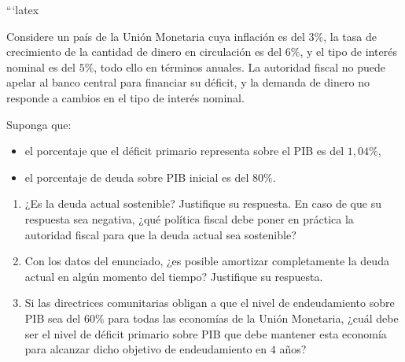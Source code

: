 ```latex
\begin{exercise}
Considere un país de la Unión Monetaria cuya inflación es del $3\%$, la tasa de crecimiento de la cantidad de dinero en circulación es del $6\%$, y el tipo de interés nominal es del $5\%$, todo ello en términos anuales. La autoridad fiscal no puede apelar al banco central para financiar su déficit, y la demanda de dinero no responde a cambios en el tipo de interés nominal.

Suponga que:
\begin{itemize}
    \item[(i)] el porcentaje que el déficit primario representa sobre el PIB es del $1{,}04\%$,
    \item[(ii)] el porcentaje de deuda sobre PIB inicial es del $80\%$.
\end{itemize}

\begin{enumerate}[label=\Alph*)]
    \item ¿Es la deuda actual sostenible? Justifique su respuesta. En caso de que su respuesta sea negativa, ¿qué política fiscal debe poner en práctica la autoridad fiscal para que la deuda actual sea sostenible?
    
    \item Con los datos del enunciado, ¿es posible amortizar completamente la deuda actual en algún momento del tiempo? Justifique su respuesta.
    
    \item Si las directrices comunitarias obligan a que el nivel de endeudamiento sobre PIB sea del $60\%$ para todas las economías de la Unión Monetaria, ¿cuál debe ser el nivel de déficit primario sobre PIB que debe mantener esta economía para alcanzar dicho objetivo de endeudamiento en $4$ años?
\end{enumerate}
\end{exercise}

